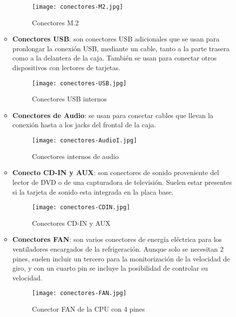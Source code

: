 \begin{itemize}
\begin{itemize}
    \begin{figure}[H]
        \centering
        \texttt{[image: conectores-M2.jpg]}
        \caption{Conectores M.2}
    \end{figure}

    \item \textbf{Conectores USB}: son conectores USB adicionales que se usan para pronlongar la conexión USB, mediante un cable, tanto a la parte trasera como a la delantera de la caja. También se usan para conectar otros dispositivos con lectores de tarjetas.

    \begin{figure}[H]
        \centering
        \texttt{[image: conectores-USB.jpg]}
        \caption{Conectores USB internos}
    \end{figure}

    \item \textbf{Conectores de Audio}: se usan para conectar cables que llevan la conexión hasta a los jacks del frontal de la caja.

    \begin{figure}[H]
        \centering
        \texttt{[image: conectores-AudioI.jpg]}
        \caption{Conectores internos de audio}
    \end{figure}

    \item \textbf{Conecto CD-IN y AUX}: son conectores de sonido proveniente  del lector de DVD o de una capturadora de televisión. Suelen estar presentes si la tarjeta de sonido esta integrada en la placa base.

    \begin{figure}[H]
        \centering
        \texttt{[image: conectores-CDIN.jpg]}
        \caption{Conectores CD-IN y AUX}
    \end{figure}

    \item \textbf{Conectores FAN}: son varios conectores de energía eléctrica para los ventiladores encargados de la refrigeración. Aunque solo se necesitan 2 pines, suelen incluir un tercero para la monitorización de la velocidad de giro, y con un cuarto pin se incluye la posibilidad de controlar su velocidad.

    \begin{figure}[H]
        \centering
        \texttt{[image: conectores-FAN.jpg]}
        \caption{Conector FAN de la CPU con 4 pines}
    \end{figure}
    \end{itemize}
\end{itemize}





\glsaddall
\printglossaries


\newpage
{}



